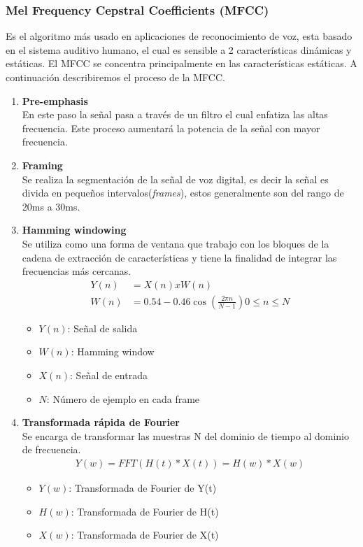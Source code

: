 \subsubsection{Mel Frequency Cepstral Coefficients (MFCC)}
Es el algoritmo más usado en aplicaciones de reconocimiento de voz, esta basado en el sistema auditivo humano, el cual es sensible a 2 características dinámicas y estáticas. El MFCC se concentra principalmente en las características estáticas. A continuación describiremos el proceso de la MFCC.
\begin{enumerate}
	\item \textbf{Pre-emphasis\\}
	En este paso la señal pasa a través de un filtro el cual enfatiza las altas frecuencia. Este proceso aumentará la potencia de la señal con mayor frecuencia.
	\item \textbf{Framing\\}
	Se realiza la segmentación de la señal de voz digital, es decir la señal es divida en pequeños intervalos(\textit{frames}), estos generalmente son del rango de 20ms a 30ms.

	\item \textbf{Hamming windowing\\}
	Se utiliza como una forma de ventana que trabajo con los bloques de la cadena de extracción de características y tiene la finalidad de integrar las frecuencias más cercanas.
	\begin{equation}
	\label{STs3}
	\begin{aligned}
	Y(n)&= X(n) x W(n)\\
	W(n)&=0.54-0.46\cos(\frac{2\pi n}{N-1})    0\leq n\leq N
	\end{aligned}
	\end{equation}
	\begin{itemize}
		\item $Y(n)$: Señal de salida
		\item $W(n)$: Hamming window
		\item $X(n)$: Señal de entrada
		\item $N$: Número de ejemplo en cada frame
	\end{itemize}
	\item \textbf{Transformada rápida de Fourier\\} 
	Se encarga de transformar las muestras N del dominio de tiempo al dominio de frecuencia.
	\begin{equation}
		\label{TFF}
		\begin{aligned}
		Y(w)= FFT(H(t)\ast X(t))= H(w) \ast X(w)
		\end{aligned}
	\end{equation}
		\begin{itemize}
			\item $Y(w)$: Transformada de Fourier de Y(t)
			\item $H(w)$: Transformada de Fourier de H(t)
			\item $X(w)$: Transformada de Fourier de X(t)


\end{itemize}
\end{enumerate}
